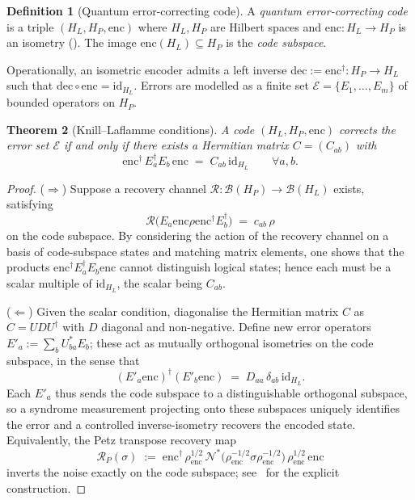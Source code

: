 \documentclass[12pt]{article}
\newtheorem{theorem}{Theorem}[section]
\theoremstyle{definition}
\newtheorem{definition}[theorem]{Definition}
\theoremstyle{remark}
\newcommand{\enc}{\mathrm{enc}}
\newcommand{\dec}{\mathrm{dec}}
\newcommand{\id}{\mathrm{id}}
\begin{document}
\begin{definition}[Quantum error-correcting code]
\label{def:qecc}
A \emph{quantum error-correcting code} is a triple $(H_L, H_P, \enc)$ where $H_L,H_P$ are Hilbert spaces and $\enc\colon H_L \to H_P$ is an isometry (). The image $\enc(H_L) \subseteq H_P$ is the \emph{code subspace}.
\end{definition}

Operationally, an isometric encoder admits a left inverse $\dec := \enc^\dagger\colon H_P \to H_L$ such that $\dec \circ \enc = \id_{H_L}$. Errors are modelled as a finite set $\mathcal{E} = \{E_1,\dots,E_m\}$ of bounded operators on $H_P$.

\begin{theorem}[Knill--Laflamme conditions]
\label{thm:knilllaflamme}
A code $(H_L,H_P,\enc)$ corrects the error set $\mathcal{E}$ if and only if there exists a Hermitian matrix $C = (C_{ab})$ with
\[
\enc^\dagger \, E_a^\dagger E_b\, \enc \;=\; C_{ab}\, \id_{H_L} \qquad \forall a,b.
\]
\end{theorem}

\begin{proof}
($\Rightarrow$) Suppose a recovery channel $\mathcal{R}\colon \mathcal{B}(H_P) \to \mathcal{B}(H_L)$ exists, satisfying
\[
\mathcal{R}\bigl(E_a \enc\rho \enc^\dagger E_b^\dagger\bigr) \;=\; c_{ab}\,\rho
\]
on the code subspace. By considering the action of the recovery channel on a basis of code-subspace states and matching matrix elements, one shows that the products $\enc^\dagger E_a^\dagger E_b \enc$ cannot distinguish logical states; hence each must be a scalar multiple of $\id_{H_L}$, the scalar being $C_{ab}$.

($\Leftarrow$) Given the scalar condition, diagonalise the Hermitian matrix $C$ as $C = UDU^\dagger$ with $D$ diagonal and non-negative. Define new error operators $E'_a := \sum_b U^*_{ba} E_b$; these act as mutually orthogonal isometries on the code subspace, in the sense that
\[
(E'_a \enc)^\dagger (E'_b \enc) \;=\; D_{aa}\,\delta_{ab}\,\id_{H_L}.
\]
Each $E'_a$ thus sends the code subspace to a distinguishable orthogonal subspace, so a syndrome measurement projecting onto these subspaces uniquely identifies the error and a controlled inverse-isometry recovers the encoded state. Equivalently, the Petz transpose recovery map
\[
\mathcal{R}_P(\sigma) \;:=\; \enc^\dagger\,\rho_{\mathrm{enc}}^{1/2}\,\mathcal{N}^*\!\bigl(\rho_{\mathrm{enc}}^{-1/2}\sigma\rho_{\mathrm{enc}}^{-1/2}\bigr)\,\rho_{\mathrm{enc}}^{1/2}\,\enc
\]
inverts the noise exactly on the code subspace; see~\cite{nielsenchuang} for the explicit construction.
\end{proof}
\end{document}
